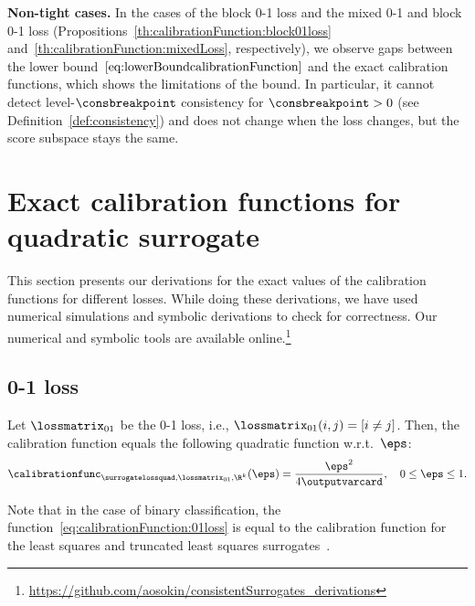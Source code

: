 \documentclass{article}
\begin{document}
\textbf{Non-tight cases.}
In the cases of the block 0-1 loss and the mixed 0-1 and block 0-1 loss   (Propositions~\ref{th:calibrationFunction:block01loss} and~\ref{th:calibrationFunction:mixedLoss}, respectively), we observe gaps between the lower bound~$\eqref{eq:lowerBoundcalibrationFunction}$ and the exact calibration functions, which shows the limitations of the bound.
In particular, it cannot detect level-$\consbreakpoint$ consistency for $\consbreakpoint > 0$ (see Definition~\ref{def:consistency}) and does not change when the loss changes, but the score subspace stays the same.


%
%


\section{Exact calibration functions for quadratic surrogate}
\label{sec:exactTranferProofs}
This section presents our derivations for the exact values of the calibration functions for different losses.
While doing these derivations, we have used numerical simulations and symbolic derivations to check for correctness.
Our numerical and symbolic tools are available online.\footnote{\url{https://github.com/aosokin/consistentSurrogates_derivations}}

\subsection{0-1 loss}
\label{sec:exactTranferProofs:01loss}
\begin{proposition}
    \label{th:calibrationFunction:01loss}
    Let $\lossmatrix_{01}$ be the 0-1 loss, i.e., $\lossmatrix_{01}(i, j) = [i \neq j]$.
    Then, the calibration function equals the following quadratic function w.r.t.\ $\eps$:
    \begin{equation}
    \label{eq:calibrationFunction:01loss}
    \calibrationfunc_{\surrogatelossquad,\lossmatrix_{01},\R^k}(\eps) = \frac{\eps^2}{4\outputvarcard},
    \quad 0 \leq \eps \leq 1.
    \end{equation}
\end{proposition}
Note that in the case of binary classification, the function~\eqref{eq:calibrationFunction:01loss} is equal to the calibration function for the least squares and truncated least squares surrogates~\citep{bartlett06convexity,steinwart07}.
\end{document}
